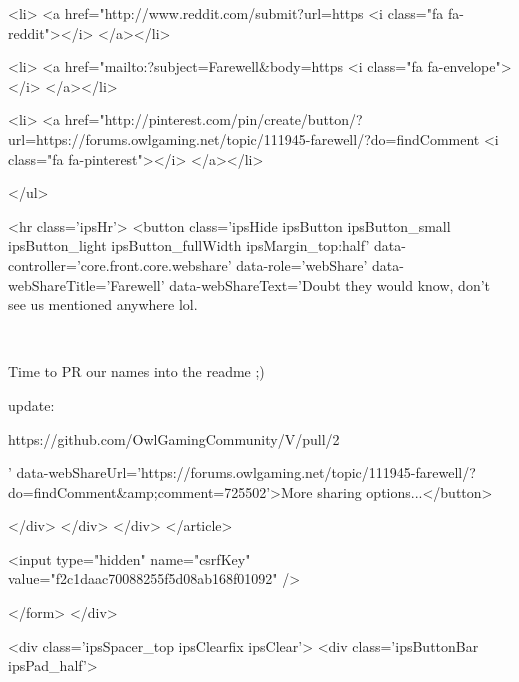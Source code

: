 			<li>
<a href="http://www.reddit.com/submit?url=https%
	<i class="fa fa-reddit"></i>
</a></li>
		
			<li>
<a href="mailto:?subject=Farewell&body=https%
	<i class="fa fa-envelope"></i>
</a></li>
		
			<li>
<a href="http://pinterest.com/pin/create/button/?url=https://forums.owlgaming.net/topic/111945-farewell/?do=findComment%
	<i class="fa fa-pinterest"></i>
</a></li>
		
	</ul>


	<hr class='ipsHr'>
	<button class='ipsHide ipsButton ipsButton_small ipsButton_light ipsButton_fullWidth ipsMargin_top:half' data-controller='core.front.core.webshare' data-role='webShare' data-webShareTitle='Farewell' data-webShareText='Doubt they would know, don’t see us mentioned anywhere lol.
 


	 
 


	Time to PR our names into the readme ;)
 


	update:
 


	https://github.com/OwlGamingCommunity/V/pull/2
 
' data-webShareUrl='https://forums.owlgaming.net/topic/111945-farewell/?do=findComment&amp;comment=725502'>More sharing options...</button>

	
</div>
</div>
	</div>
</article>
					
				
			
			
<input type="hidden" name="csrfKey" value="f2c1daac70088255f5d08ab168f01092" />


		</form>
	</div>

	
	
		<div class='ipsSpacer_top ipsClearfix ipsClear'>
			<div class='ipsButtonBar ipsPad_half'>


